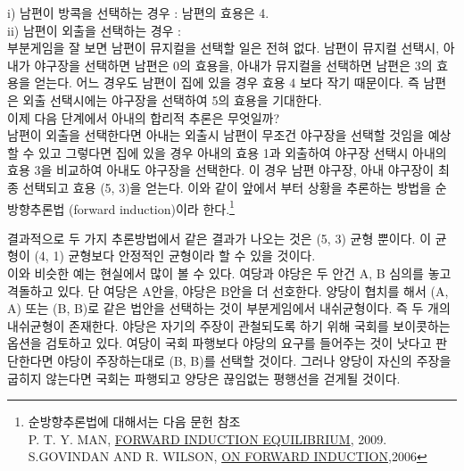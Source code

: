 \documentclass{oblivoir}
\begin{document}
i) 남편이 방콕을 선택하는 경우 : 남편의 효용은 4.\\
ii) 남편이 외출을 선택하는 경우 :\\
부분게임을 잘 보면 남편이 뮤지컬을 선택할 일은 전혀 없다. 남편이  뮤지컬 선택시, 아내가 야구장을 선택하면 남편은 0의 효용을, 아내가 뮤지컬을 선택하면 남편은 3의 효용을 얻는다. 어느 경우도 남편이 집에 있을 경우 효용 4 보다 작기 때문이다. 
즉 남편은 외출 선택시에는 야구장을 선택하여 5의 효용을 기대한다.  \\

이제 다음 단계에서 아내의 합리적 추론은 무엇일까?\\
남편이 외출을 선택한다면 아내는 외출시 남편이 무조건 야구장을 선택할 것임을 예상할 수 있고 그렇다면 집에 있을 경우 아내의 효용 1과 외출하여 야구장 선택시 아내의 효용 3을 비교하여 아내도 야구장을 선택한다. 이 경우 남편 야구장, 아내 야구장이 최종 선택되고 효용 (5, 3)을 얻는다. 이와 같이 앞에서 부터 상황을 추론하는 방법을 순방향추론법 (forward induction)이라 한다.\footnote{순방향추론법에 대해서는 다음 문헌 참조\\
P. T. Y. MAN,	\href{http://econ.shufe.edu.cn/upload/htmleditor/Image/44347_1003080941041.pdf} {FORWARD INDUCTION EQUILIBRIUM}, 2009.\\
	S.GOVINDAN AND R. WILSON,  \href{http://www.dklevine.com/archive/refs4321307000000000618.pdf}{ON FORWARD INDUCTION},2006}

결과적으로 두 가지 추론방법에서 같은 결과가 나오는 것은 (5, 3) 균형 뿐이다. 이 균형이 (4, 1) 균형보다 안정적인 균형이라 할 수 있을 것이다.\\

이와 비슷한 예는 현실에서 많이 볼 수 있다. 여당과 야당은 두 안건 A, B 심의를 놓고 격돌하고 있다. 단 여당은 A안을, 야당은 B안을 더 선호한다. 양당이 협치를 해서 (A, A) 또는 (B, B)로 같은 법안을 선택하는 것이  부분게임에서 내쉬균형이다. 즉 두 개의 내쉬균형이 존재한다. 야당은 자기의 주장이 관철되도록 하기 위해 국회를 보이콧하는 옵션을 검토하고 있다. 여당이 국회 파행보다 야당의 요구를 들어주는 것이 낫다고 판단한다면  야당이 주장하는대로 (B, B)를 선택할 것이다. 그러나 양당이 자신의 주장을 굽히지 않는다면 국회는 파행되고 양당은 끊임없는 평행선을 걷게될 것이다.\\
\end{document}
